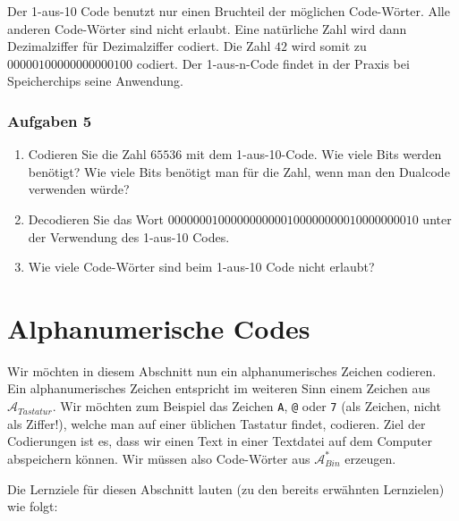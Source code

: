 Der 1-aus-10 Code benutzt nur einen Bruchteil der möglichen Code-Wörter. Alle anderen Code-Wörter sind nicht erlaubt. Eine natürliche Zahl wird dann Dezimalziffer für Dezimalziffer codiert. Die Zahl $42$ wird somit zu $00000100000000000100$ codiert. Der 1-aus-n-Code findet in der Praxis bei Speicherchips seine Anwendung.

\subsubsection{Aufgaben 5}

\begin{enumerate}
\item Codieren Sie die Zahl $65536$ mit dem 1-aus-10-Code. Wie viele Bits werden benötigt? Wie viele Bits benötigt man für die Zahl, wenn man den Dualcode verwenden würde?
\item Decodieren Sie das Wort $0000000100000000000100000000010000000010$ unter der Verwendung des 1-aus-10 Codes.
\item Wie viele Code-Wörter sind beim 1-aus-10 Code nicht erlaubt?
\end{enumerate}

\newpage

\section{Alphanumerische Codes}
\label{section-alphanumerische-codes}

Wir möchten in diesem Abschnitt nun ein alphanumerisches Zeichen codieren. Ein alphanumerisches Zeichen entspricht im weiteren Sinn einem Zeichen aus $\mathscr{A}_{Tastatur}$. Wir möchten zum Beispiel das Zeichen \texttt{A}, \texttt{@} oder \texttt{7} (als Zeichen, nicht als Ziffer!), welche man auf einer üblichen Tastatur findet, codieren. Ziel der Codierungen ist es, dass wir einen Text in einer Textdatei auf dem Computer abspeichern können. Wir müssen also Code-Wörter aus $\mathscr{A}_{Bin}^*$ erzeugen. 

Die Lernziele für diesen Abschnitt lauten (zu den bereits erwähnten Lernzielen) wie folgt:

\newcommand{\alphabnumerischeCodesLernziele}{
\protect\begin{todolist}
\item Sie erklären, warum es für gewisse Codierungen einen Standard gibt.
\item Sie nennen und erklären bekannte Codes.
\end{todolist}
}

